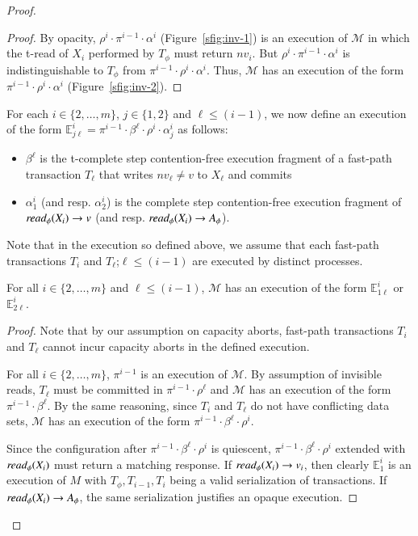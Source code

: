 \begin{proof}
\begin{proof}
		By opacity, $\rho^i\cdot \pi^{i-1} \cdot \alpha^i$ (Figure~\ref{sfig:inv-1}) is an execution
		of $\mathcal{M}$ in which the t-read of $X_i$ performed by $T_{\phi}$ must return $nv_i$.
		But $\rho^i \cdot \pi^{i-1} \cdot \alpha^i$ is indistinguishable to $T_{\phi}$ from
		$\pi^{i-1}\cdot \rho^i \cdot \alpha^i$.
		Thus, $\mathcal{M}$ has an execution of the form $\pi^{i-1}\cdot \rho^i \cdot \alpha^i$ (Figure~\ref{sfig:inv-2}).
	\end{proof}
	For each $i\in \{2,\ldots, m\}$, $j\in \{1,2\}$ and $\ell \leq (i-1)$, 
	we now define an execution of the form  $\mathbb{E}_{j\ell}^{i}=\pi^{i-1}\cdot \beta^{\ell}\cdot \rho^i \cdot \alpha_j^i$
	as follows:
	\begin{itemize}
		\item
		$\beta^{\ell}$ is the t-complete step contention-free execution fragment of a fast-path transaction $T_{\ell}$
		that writes $nv_{\ell}\neq v$ to $X_{\ell}$ and commits
		\item
		$\alpha_1^i$ (and resp. $\alpha_2^i$) is the complete step contention-free execution fragment of 
		$\textit{read}_{\phi}(X_i) \rightarrow v$ (and resp. $\textit{read}_{\phi}(X_i) \rightarrow A_{\phi}$).
	\end{itemize}
	Note that in the execution so defined above, we assume that each fast-path transactions $T_i$ and $T_{\ell}$;$\ell \leq (i-1)$ are executed by distinct processes.
	\begin{claim}
		\label{cl:ic2}
		For all $i\in \{2,\ldots, m\}$ and $\ell \leq (i-1)$, $\mathcal{M}$ has an execution of the form $\mathbb{E}_{1\ell}^{i}$ or 
		$\mathbb{E}_{2\ell}^{i}$.
	\end{claim}
	\begin{proof}
		Note that by our assumption on capacity aborts, fast-path transactions $T_i$ and $T_{\ell}$ cannot incur capacity aborts in the defined execution.
		
		For all $i \in \{2,\ldots, m\}$, $\pi^{i-1}$
		is an execution of $\mathcal{M}$.
		By assumption of invisible reads, $T_{{\ell}}$ must be committed in $\pi^{i-1}\cdot \rho^{\ell}$
		and $\mathcal{M}$ has an execution of the form $\pi^{i-1}\cdot \beta^{\ell}$.
		By the same reasoning, since $T_i$ and $T_{\ell}$ do not have conflicting data sets,
		$\mathcal{M}$ has an execution of the form $\pi^{i-1}\cdot\beta^{\ell}\cdot \rho^i$.
		
		Since the configuration after $\pi^{i-1}\cdot\beta^{\ell}\cdot \rho^i$ is quiescent,
		$\pi^{i-1}\cdot\beta^{\ell}\cdot \rho^i$ extended with $\textit{read}_{\phi}(X_i)$
		must return a matching response.
		If $\textit{read}_{\phi}(X_i) \rightarrow v_i$, then clearly $\mathbb{E}_{1}^{i}$
		is an execution of $M$ with $T_{\phi}, T_{i-1}, T_i$ being a valid serialization
		of transactions.
		If $\textit{read}_{\phi}(X_i) \rightarrow A_{\phi}$, the same serialization
		justifies an opaque execution.
		

\end{proof}
\end{proof}
